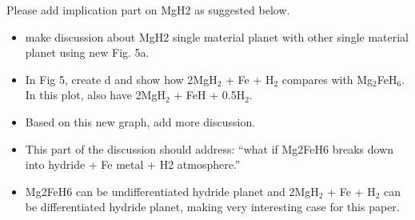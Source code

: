\documentclass[draft,jgrga,12pt]{agujournal2019}
\begin{document}

\begin{cbox}
Please add implication part on MgH2 as suggested below.
\begin{itemize}
    \item make discussion about MgH2 single material planet with other single material planet using new Fig. 5a.
    \item In Fig 5, create d and show how 2MgH$_2$ + Fe + H$_2$ compares with Mg$_2$FeH$_6$.  In this plot, also have 2MgH$_2$ + FeH + 0.5H$_2$.
    \item Based on this new graph, add more discussion.  
    \item This part of the discussion should address: ``what if Mg2FeH6 breaks down into hydride + Fe metal + H2 atmosphere.''
    \item Mg2FeH6 can be undifferentiated hydride planet and 2MgH$_2$ + Fe + H$_2$ can be differentiated hydride planet, making very interesting case for this paper.
\end{itemize}
\XWrevised
\end{cbox}
\end{document}
